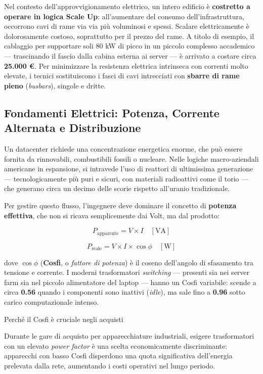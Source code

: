 \documentclass[
  italian,
  openany]{book}
\begin{document}
Nel contesto dell'approvvigionamento elettrico, un intero edificio è
\textbf{costretto a operare in logica Scale Up}: all'aumentare del
consumo dell'infrastruttura, occorrono cavi di rame via via più
voluminosi e spessi. Scalare elettricamente è dolorosamente costoso,
soprattutto per il prezzo del rame. A titolo di esempio, il cablaggio
per supportare soli 80 kW di picco in un piccolo complesso accademico
--- trascinando il fascio dalla cabina esterna ai server --- è arrivato
a costare circa \textbf{25.000 €}. Per minimizzare la resistenza
elettrica intrinseca con correnti molto elevate, i tecnici sostituiscono
i fasci di cavi intrecciati con \textbf{sbarre di rame pieno}
(\emph{busbars}), singole e dritte.

\subsection{Fondamenti Elettrici: Potenza, Corrente Alternata e
Distribuzione}\label{fondamenti-elettrici-potenza-corrente-alternata-e-distribuzione}

Un datacenter richiede una concentrazione energetica enorme, che può
essere fornita da rinnovabili, combustibili fossili o nucleare. Nelle
logiche macro-aziendali americane in espansione, si intravede l'uso di
reattori di ultimissima generazione --- tecnologicamente più puri e
sicuri, con materiali radioattivi come il torio --- che generano circa
un decimo delle scorie rispetto all'uranio tradizionale.

Per gestire questo flusso, l'ingegnere deve dominare il concetto di
\textbf{potenza effettiva}, che non si ricava semplicemente dai Volt, ma
dal prodotto:

\[
P_{\text{apparente}} = V \times I \quad [\text{VA}]
\]

\[
P_{\text{reale}} = V \times I \times \cos\phi \quad [\text{W}]
\]

dove \(\cos\phi\) (\textbf{Cosfi}, o \emph{fattore di potenza}) è il
coseno dell'angolo di sfasamento tra tensione e corrente. I moderni
trasformatori \emph{switching} --- presenti sia nei server farm sia nel
piccolo alimentatore del laptop --- hanno un Cosfi variabile: scende a
circa \textbf{0.56} quando i componenti sono inattivi (\emph{idle}), ma
sale fino a \textbf{0.96} sotto carico computazionale intenso.

\begin{callouttip}{Perché il Cosfi è cruciale negli acquisti}

Durante le gare di acquisto per apparecchiature industriali, esigere
trasformatori con un elevato \emph{power factor} è una scelta
economicamente discriminante: apparecchi con basso Cosfi disperdono una
quota significativa dell'energia prelevata dalla rete, aumentando i
costi operativi nel lungo periodo.

\end{callouttip}
\end{document}
